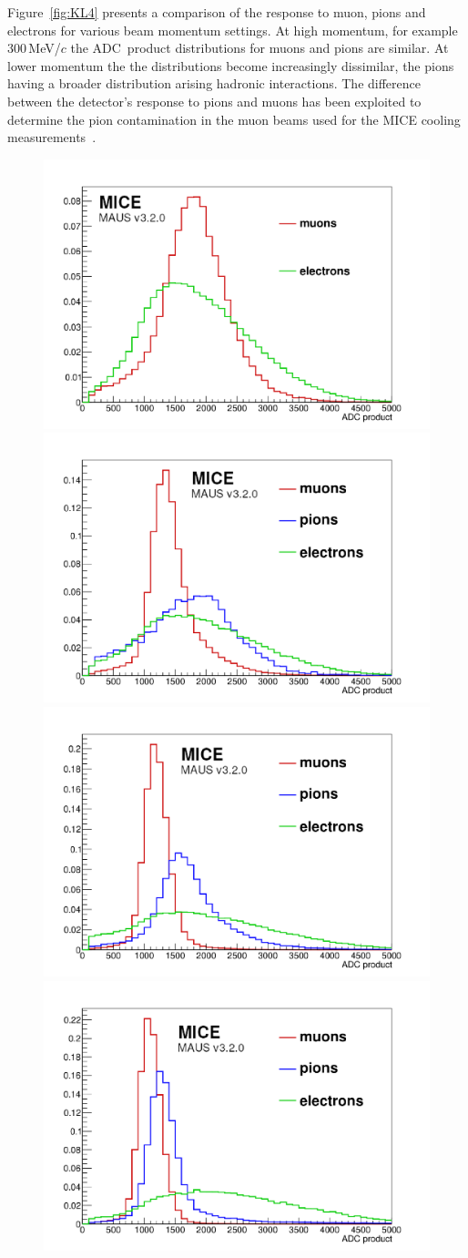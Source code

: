 Figure~\ref{fig:KL4} presents a comparison of the response to muon,
pions and electrons for various beam momentum settings.
At high momentum, for example 300\,MeV/$c$ the ADC~product
distributions for muons and pions are similar.
At lower momentum the the distributions become increasingly dissimilar,
the pions having a broader distribution arising hadronic
interactions.
The difference between the detector's response to pions and muons has
been exploited to determine the pion contamination in the muon beams
used for the MICE cooling measurements~\cite{2016JInst..11P3001A}.  
\begin{figure}
  \begin{center}
    \includegraphics[width=0.45\columnwidth]{./04-KL/Figures/mu_vs_e_140MEV.pdf}
    \includegraphics[width=0.45\columnwidth]{./04-KL/Figures/mu_vs_pi_vs_e_170MEV.pdf} 
    \includegraphics[width=0.45\columnwidth]{./04-KL/Figures/mu_vs_pi_vs_e_200MEV.pdf}
    \includegraphics[width=0.45\columnwidth]{./04-KL/Figures/mu_vs_pi_vs_e_240MEV.pdf}  	

\end{center}
\end{figure}
